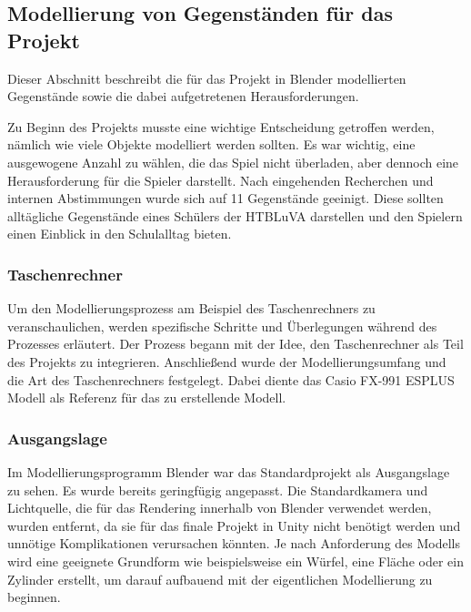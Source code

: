 \subsection{Modellierung von Gegenständen für das Projekt}
Dieser Abschnitt beschreibt die für das Projekt in Blender modellierten Gegenstände sowie die dabei aufgetretenen Herausforderungen.

Zu Beginn des Projekts musste eine wichtige Entscheidung getroffen werden, nämlich wie viele Objekte modelliert werden
sollten. Es war wichtig, eine ausgewogene Anzahl zu wählen, die das Spiel nicht überladen, aber dennoch eine
Herausforderung für die Spieler darstellt. Nach eingehenden Recherchen und internen Abstimmungen wurde sich auf 11
Gegenstände geeinigt. Diese sollten alltägliche Gegenstände eines Schülers der HTBLuVA darstellen und den Spielern
einen Einblick in den Schulalltag bieten.

\subsubsection{Taschenrechner}
Um den Modellierungsprozess am Beispiel des Taschenrechners zu veranschaulichen, werden spezifische Schritte und
Überlegungen während des Prozesses erläutert. Der Prozess begann mit der Idee, den Taschenrechner als Teil des Projekts
zu integrieren. Anschließend wurde der Modellierungsumfang und die Art des Taschenrechners festgelegt. Dabei diente das
Casio FX-991 ESPLUS Modell als Referenz für das zu erstellende Modell.

\subsubsection*{Ausgangslage}
Im Modellierungsprogramm Blender war das Standardprojekt als Ausgangslage zu sehen. Es wurde bereits geringfügig
angepasst. Die Standardkamera und Lichtquelle, die für das Rendering innerhalb von Blender verwendet werden, wurden
entfernt, da sie für das finale Projekt in Unity nicht benötigt werden und unnötige Komplikationen verursachen könnten.
Je nach Anforderung des Modells wird eine geeignete Grundform wie beispielsweise ein Würfel, eine Fläche oder ein Zylinder
erstellt, um darauf aufbauend mit der eigentlichen Modellierung zu beginnen.

